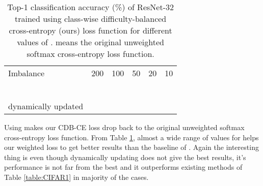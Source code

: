 \documentclass[runningheads]{llncs}
\begin{document}
\setlength{\tabcolsep}{4pt}
\begin{table}[t]
\begin{center}
\caption{
Top-1 classification accuracy (\%) of ResNet-32 trained using class-wise difficulty-balanced cross-entropy (ours) loss function for different values of .  means the original
unweighted softmax cross-entropy loss function.
}
\label{table:CIFAR2}
\begin{tabular}{llllll}
\hline\noalign{\smallskip}
Imbalance & 200 & 100 & 50 & 20 & 10\\
\noalign{\smallskip}
\hline
\noalign{\smallskip}
 & &  &  &  & \\
 & &  &  &  & \\
 & &  &  &  & \\
 & &  &  &  & \\
 & &  &  &  & \\
 & &  &  &  & \\
dynamically updated  & &  &  &  & \\
\hline
\end{tabular}
\end{center}
\end{table}
\setlength{\tabcolsep}{1.4pt}



Using  makes our CDB-CE loss drop back to the original unweighted 
softmax cross-entropy loss function. From Table \ref{table:CIFAR2}, almost a wide range of values 
for 
helps our weighted loss to get better results than the baseline of . 
Again the interesting thing is even though dynamically updating  does not 
give the best results, it’s performance is not far from the best and it 
outperforms existing methods of Table \ref{table:CIFAR1} in majority of the cases.
\end{document}
